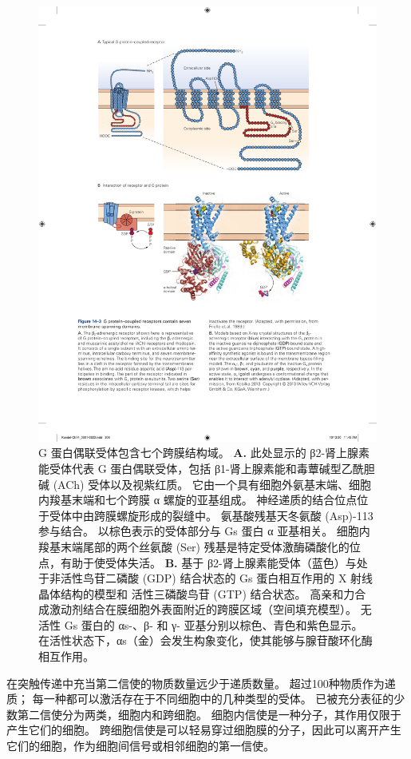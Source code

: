 \begin{figure}[htbp]
	\centering
	\includegraphics[width=0.75\linewidth]{chap14/fig_14_3}
	\caption{G 蛋白偶联受体包含七个跨膜结构域。
		\textbf{A.} 此处显示的 β2-肾上腺素能受体代表 G 蛋白偶联受体，包括 β1-肾上腺素能和毒蕈碱型乙酰胆碱 (ACh) 受体以及视紫红质。
		它由一个具有细胞外氨基末端、细胞内羧基末端和七个跨膜 α 螺旋的亚基组成。
		神经递质的结合位点位于受体中由跨膜螺旋形成的裂缝中。
		氨基酸残基天冬氨酸 (Asp)-113 参与结合。
		以棕色表示的受体部分与 Gs 蛋白 α 亚基相关。
		细胞内羧基末端尾部的两个丝氨酸 (Ser) 残基是特定受体激酶磷酸化的位点，有助于使受体失活\cite{frielle1989beta}。
		\textbf{B.} 基于 β2-肾上腺素能受体（蓝色）与处于非活性鸟苷二磷酸 (GDP) 结合状态的 Gs 蛋白相互作用的 X 射线晶体结构的模型和 活性三磷酸鸟苷 (GTP) 结合状态。
		高亲和力合成激动剂结合在膜细胞外表面附近的跨膜区域（空间填充模型）。
		无活性 Gs 蛋白的 αs-、β- 和 γ- 亚基分别以棕色、青色和紫色显示。
		在活性状态下，αs（金）会发生构象变化，使其能够与腺苷酸环化酶相互作用\cite{kobilka2013structural}。}
	\label{fig:14_3}
\end{figure}


在突触传递中充当第二信使的物质数量远少于递质数量。 超过100种物质作为递质；
每一种都可以激活存在于不同细胞中的几种类型的受体。
已被充分表征的少数第二信使分为两类，细胞内和跨细胞。
细胞内信使是一种分子，其作用仅限于产生它们的细胞。 
跨细胞信使是可以轻易穿过细胞膜的分子，因此可以离开产生它们的细胞，作为细胞间信号或相邻细胞的第一信使。


